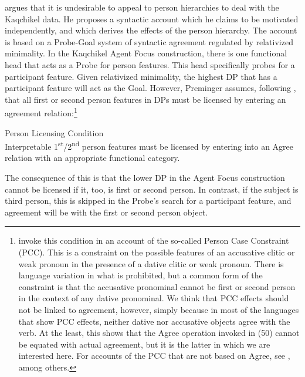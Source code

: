 \documentclass[output=paper]{langsci/langscibook}
\begin{document}
\citet{Preminger2014} argues that it is undesirable to appeal to person hierarchies to deal with the Kaqchikel data. He proposes a syntactic account which he claims to be motivated independently, and which derives the effects of the person hierarchy. The account is based on a Probe-Goal system of syntactic agreement regulated by relativized minimality. In the Kaqchikel Agent Focus construction, there is one functional head that acts as a Probe for person features. This head specifically probes for a participant feature. Given relativized minimality, the highest DP that has a participant feature will act as the Goal. However, Preminger assumes, following \citet{Bejar2003}, that all first or second person features in DPs must be licensed by entering an agreement relation:\footnote{\citet{Bejar2003} invoke this condition in an account of the so-called Person Case Constraint (PCC). This is a constraint on the possible features of an accusative clitic or weak pronoun in the presence of a dative clitic or weak pronoun. There is language variation in what is prohibited, but a common form of the constraint is that the accusative pronominal cannot be first or second person in the context of any dative pronominal. We think that PCC effects should not be linked to agreement, however, simply because in most of the languages that show PCC effects, neither dative nor accusative objects agree with the verb. At the least, this shows that the Agree operation invoked in (50) cannot be equated with actual agreement, but it is the latter in which we are interested here. For accounts of the PCC that are not based on Agree, see \citet{Haspelmath2004,Runić2013,Kiss2015}, among others.}

\ea \label{bkm:Ref454187927}  Person Licensing Condition \citep{Bejar2003}\\
Interpretable 1\textsuperscript{st}/2\textsuperscript{nd} person features must be licensed by entering into an Agree relation with an appropriate functional category.
\z

The consequence of this is that the lower DP in the Agent Focus construction cannot be licensed if it, too, is first or second person. In contrast, if the subject is third person, this is skipped in the Probe’s search for a participant feature, and agreement will be with the first or second person object.
\end{document}
